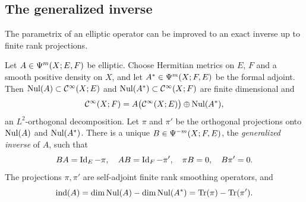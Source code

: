 \subsection{The generalized inverse}
The parametrix of an elliptic operator can be improved to an exact inverse up to
finite rank projections.

\begin{proposition}\label{index:prop:generalized-inverse}
  Let $A\in\Psi^{m}(X;E,F)$ be elliptic. Choose Hermitian metrics on $E$, $F$
  and a smooth positive density on $X$, and let $A^*\in\Psi^{m}(X;F,E)$ be
  the formal adjoint. Then $\operatorname{Nul}(A)\subset\mathcal{C}^\infty(X;E)$ and
  $\operatorname{Nul}(A^*)\subset\mathcal{C}^\infty(X;F)$ are finite dimensional and
  \begin{equation}\label{index:eq:range}
    \mathcal{C}^\infty(X;F)=A\bigl(\mathcal{C}^\infty(X;E)\bigr)\oplus\operatorname{Nul}(A^*),
  \end{equation}
  an $L^2$-orthogonal decomposition. Let $\pi$ and $\pi'$ be the orthogonal
  projections onto $\operatorname{Nul}(A)$ and $\operatorname{Nul}(A^*)$. There is a unique
  $B\in\Psi^{-m}(X;F,E)$, the \emph{generalized inverse} of $A$, such that
  \begin{equation}\label{index:eq:gen-inverse}
    BA=\operatorname{Id}_E-\pi,\quad AB=\operatorname{Id}_F-\pi',\quad \pi B=0,\quad B\pi'=0.
  \end{equation}
  The projections $\pi,\pi'$ are self-adjoint finite rank smoothing
  operators, and
  \begin{equation*}
    \operatorname{ind}(A)=\dim\operatorname{Nul}(A)-\dim\operatorname{Nul}(A^*)=\operatorname{Tr}(\pi)-\operatorname{Tr}(\pi').
  \end{equation*}
\end{proposition}
